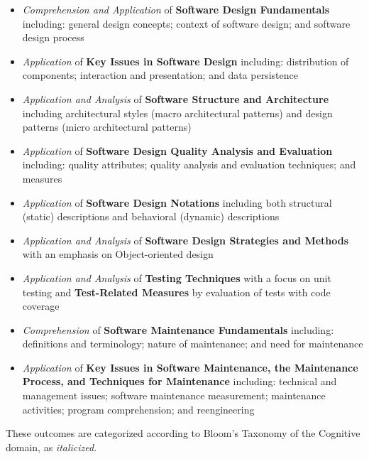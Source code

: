 \documentclass[12pt]{article}
\begin{document}
  \begin{itemize}
    \item \textit{Comprehension and Application} of \textbf{Software Design Fundamentals} including: general design concepts; context of software design; and software design process
    \item \textit{Application} of \textbf{Key Issues in Software Design} including: distribution of components; interaction and presentation; and data persistence
    \item \textit{Application and Analysis} of \textbf{Software Structure and Architecture} including architectural styles (macro architectural patterns) and design patterns (micro architectural patterns) 
    \item \textit{Application} of \textbf{Software Design Quality Analysis and Evaluation} including: quality attributes; quality analysis and evaluation techniques; and measures
    \item \textit{Application} of \textbf{Software Design Notations} including both structural (static) descriptions and behavioral (dynamic) descriptions
    \item \textit{Application and Analysis} of \textbf{Software Design Strategies and Methods} with an emphasis on Object-oriented design
    \item \textit{Application and Analysis} of \textbf{Testing Techniques} with a focus on unit testing and \textbf{Test-Related Measures} by evaluation of tests with code coverage
    \item \textit{Comprehension} of \textbf{Software Maintenance Fundamentals} including: definitions and terminology; nature of maintenance; and need for maintenance
    \item \textit{Application} of \textbf{Key Issues in Software Maintenance, the Maintenance Process, and Techniques for Maintenance} including: technical and management issues; software maintenance measurement; maintenance activities; program comprehension; and reengineering 
  \end{itemize}

  These outcomes are categorized according to Bloom's Taxonomy of the Cognitive domain, as \textit{italicized}.
\end{document}

